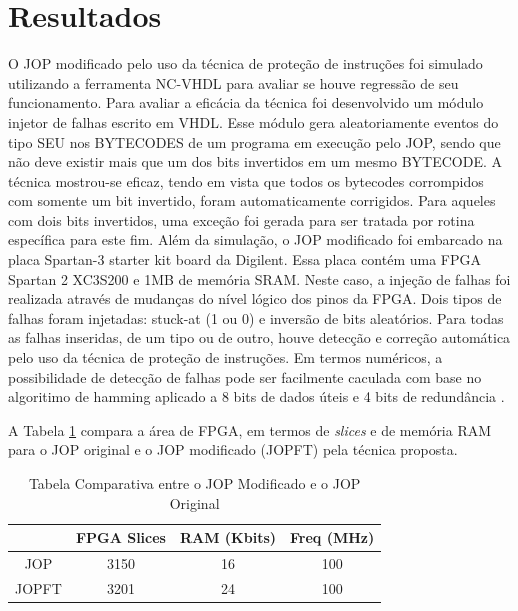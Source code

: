\documentclass[10pt,twocolumn]{article}
\begin{document}
\section{Resultados}
	O JOP modificado pelo uso da técnica de proteção de ins\-tru\-ções foi simulado utilizando a ferramenta NC-VHDL para avaliar se houve regressão de seu funcionamento. Para avaliar a eficácia da técnica foi desenvolvido um módulo injetor de falhas escrito em VHDL. Esse módulo gera aleatoriamente eventos do tipo SEU nos BYTECODES de um programa em execução pelo JOP, sendo que não deve existir mais que um dos bits invertidos em um mesmo BYTECODE. A técnica mostrou-se eficaz, tendo em vista que todos os bytecodes corrompidos com somente um bit invertido, foram automaticamente corrigidos. Para aqueles com dois bits invertidos, uma exceção foi gerada para ser tratada por rotina específica para este fim.
	Além da simulação, o JOP modificado foi embarcado na placa Spartan-3 starter kit board \cite{ug130} da Digilent. Essa placa contém uma FPGA Spartan 2 XC3S200 e 1MB de memória SRAM. Neste caso, a injeção de falhas foi realizada através de mudanças do nível lógico dos pinos da FPGA. Dois tipos de falhas foram injetadas: stuck-at (1 ou 0) e inversão de bits aleatórios. Para todas as falhas inseridas, de um tipo ou de outro, houve detecção e correção automática pelo uso da técnica de proteção de instruções. Em termos numéricos, a possibilidade de detecção de falhas pode ser facilmente caculada com base no algoritimo de hamming aplicado a 8 bits de dados úteis e 4 bits de redundância \cite{shoomanbook}.

	A Tabela \ref{tabela_resultados} compara a área de FPGA, em termos de \emph{slices} e de memória RAM para o JOP original e o JOP modificado (JOPFT) pela técnica proposta.
\begin{table}[!t]
\renewcommand{\arraystretch}{1.3}
\caption{Tabela Comparativa entre o JOP Modificado e o JOP Original}
\label{tabela_resultados}
\begin{tabular}{|c|c|c|c|}
	\hline
 &  FPGA Slices    &   RAM   (Kbits)   & Freq   (MHz)   \\
	\hline
JOP   & 3150 & 16 & 100  \\ 	\hline
JOPFT   & 3201 & 24 & 100\\ 	\hline
\end{tabular}
\end {table}
\end{document}
